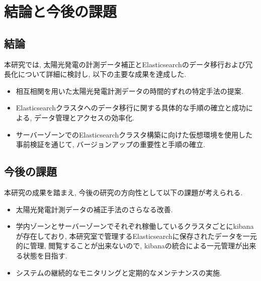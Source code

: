 \chapter{結論と今後の課題}
\label{chap:fifth}

\section{結論}
本研究では, 太陽光発電の計測データ補正とElasticsearchのデータ移行および冗長化について詳細に検討し, 以下の主要な成果を達成した.




\begin{itemize}
  \item 相互相関を用いた太陽光発電計測データの時間的ずれの特定手法の提案.
  \item Elasticsearchクラスタへのデータ移行に関する具体的な手順の確立と成功による, データ管理とアクセスの効率化.
  \item サーバーゾーンでのElasticsearchクラスタ構築に向けた仮想環境を使用した事前検証を通じて, バージョンアップの重要性と手順の確立.
\end{itemize}

\section{今後の課題}
本研究の成果を踏まえ, 今後の研究の方向性として以下の課題が考えられる.

\begin{itemize}
  \item 太陽光発電計測データの補正手法のさらなる改善.
  \item 学内ゾーンとサーバーゾーンでそれぞれ稼働しているクラスタごとにkibanaが存在しており, 本研究室で管理するElasticsearchに保存されたデータを一元的に管理, 閲覧することが出来ないので, kibanaの統合による一元管理が出来る状態を目指す.
  \item システムの継続的なモニタリングと定期的なメンテナンスの実施.
\end{itemize}
